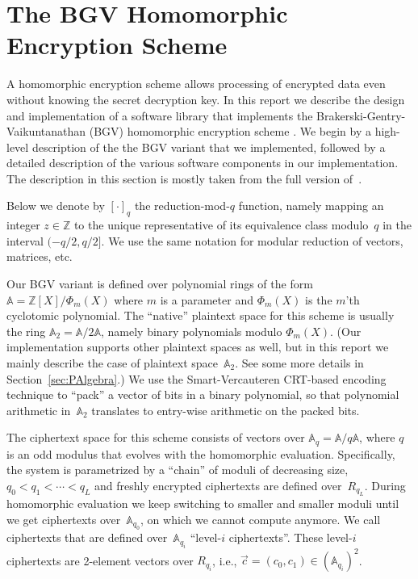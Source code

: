 \documentclass[14pt]{extarticle}
\newcommand{\secref}[1]{Section~\protect\ref{sec:#1}}
\newcommand{\A}{\mathbb{A}}
\newcommand{\Z}{\mathbb{Z}}
\def\vc{\vec{c}}
\begin{document}
\section{The BGV Homomorphic Encryption Scheme} \label{sec:BGV}
A homomorphic encryption scheme \cite{RivestAD78,Gentry09} allows
processing of
encrypted data even without knowing the secret decryption key. In this
report we describe the design and implementation of a software library
that implements the Brakerski-Gentry-Vaikuntanathan (BGV)
homomorphic encryption scheme \cite{BGV12}. We begin by a high-level
description of the the BGV variant that we implemented, followed by
a detailed description of the various software components in our
implementation. 
The description in this section is mostly taken from
the full version of~\cite{GHS12c}.

Below we denote by $[\cdot]_q$ the reduction-mod-$q$ function, namely
mapping an integer $z\in\Z$ to the unique representative of its
equivalence class modulo~$q$ in the interval $(-q/2,q/2]$. We use
the same notation for modular reduction of vectors, matrices, etc.

Our BGV variant is defined over polynomial rings of the form
$\A=\Z[X]/\Phi_m(X)$ where $m$ is a parameter and $\Phi_m(X)$ is
the $m$'th cyclotomic polynomial. The ``native'' plaintext space for
this scheme is usually the ring $\A_2=\A/2\A$, namely binary polynomials
modulo $\Phi_m(X)$. (Our implementation supports other plaintext
spaces as well, but in this report we mainly describe the case of
plaintext space~$\A_2$. See some more details in \secref{PAlgebra}.)
We use the Smart-Vercauteren CRT-based encoding technique \cite{SV11}
to ``pack'' a vector of bits in a binary polynomial, so that
polynomial arithmetic in~$\A_2$ translates to entry-wise arithmetic on
the packed bits.

The ciphertext space for this scheme consists of vectors over
$\A_q=\A/q\A$, where $q$ is an
odd modulus that evolves with the homomorphic evaluation. Specifically,
the system is parametrized by a ``chain'' of moduli of decreasing size,
$q_0< q_1< \cdots <q_L$ and freshly encrypted ciphertexts
are defined over~$R_{q_L}$. During homomorphic evaluation we keep
switching to smaller and smaller moduli until we get ciphertexts
over~$\A_{q_0}$, on which we cannot compute anymore. We call
ciphertexts that are defined over~$\A_{q_i}$ ``level-$i$
ciphertexts''. These level-$i$ ciphertexts are 2-element vectors
over $R_{q_i}$, i.e., $\vc=(c_0,c_1)\in (\A_{q_i})^2$.
\end{document}
